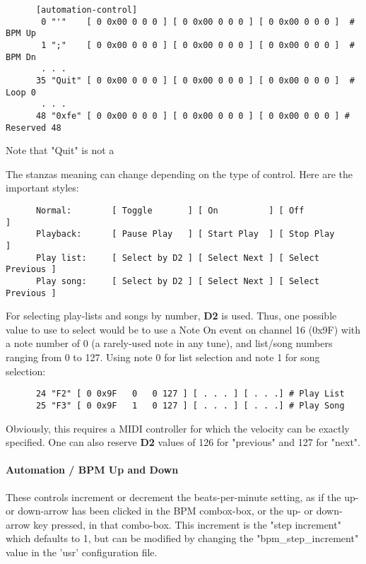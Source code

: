    \begin{verbatim}
      [automation-control]
       0 "'"    [ 0 0x00 0 0 0 ] [ 0 0x00 0 0 0 ] [ 0 0x00 0 0 0 ]  # BPM Up
       1 ";"    [ 0 0x00 0 0 0 ] [ 0 0x00 0 0 0 ] [ 0 0x00 0 0 0 ]  # BPM Dn
       . . .
      35 "Quit" [ 0 0x00 0 0 0 ] [ 0 0x00 0 0 0 ] [ 0 0x00 0 0 0 ]  # Loop 0
       . . .
      48 "0xfe" [ 0 0x00 0 0 0 ] [ 0 0x00 0 0 0 ] [ 0 0x00 0 0 0 ] # Reserved 48
   \end{verbatim}

   Note that "Quit" is not a 

   The stanzas meaning can change depending on the type of control.  Here are
   the important styles:

   \begin{verbatim}
      Normal:        [ Toggle       ] [ On          ] [ Off             ]
      Playback:      [ Pause Play   ] [ Start Play  ] [ Stop Play       ]
      Play list:     [ Select by D2 ] [ Select Next ] [ Select Previous ]
      Play song:     [ Select by D2 ] [ Select Next ] [ Select Previous ]
   \end{verbatim}

   For selecting play-lists and songs by number, \textbf{D2} is used.
   Thus, one possible value to use to select would be to use a 
   Note On event on channel 16 (0x9F) with a note number of 0 (a rarely-used
   note in any tune), and list/song numbers ranging from 0 to 127.  Using note
   0 for list selection and note 1 for song selection:

   \begin{verbatim}
      24 "F2" [ 0 0x9F   0   0 127 ] [ . . . ] [ . . .] # Play List
      25 "F3" [ 0 0x9F   1   0 127 ] [ . . . ] [ . . .] # Play Song
   \end{verbatim}

   Obviously, this requires a MIDI controller for which the velocity can be
   exactly specified.  One can also reserve \textbf{D2} values of 126 for
   "previous" and 127 for "next".

\paragraph{Automation / BPM Up and Down}
\label{paragraph:configuration_midi_ctrl_bpmupdn}

   These controls increment or decrement the beats-per-minute setting, as if
   the up- or down-arrow has been clicked in the BPM combox-box, or the up- or
   down-arrow key pressed, in that combo-box.
   This increment is the
   "step increment" which defaults to 1, but can be modified by
   changing the "bpm\_step\_increment" value in the 'usr'
   configuration file.

